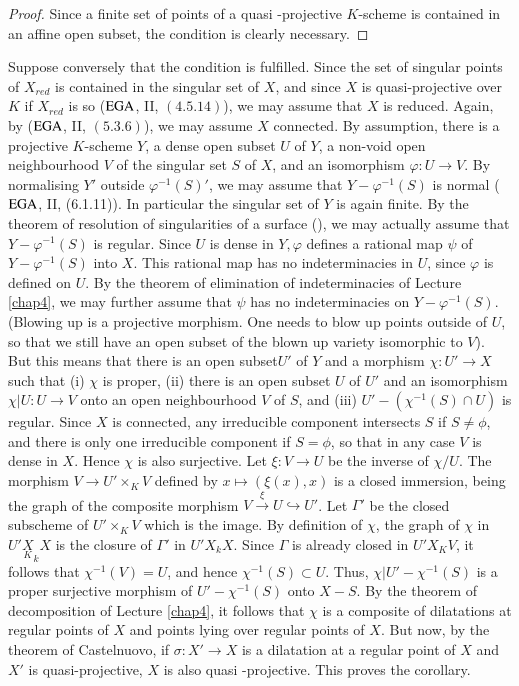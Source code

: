\begin{proof}
  Since a finite set of points of a quasi -projective $K$-scheme is
  contained in an affine open  subset, the condition is clearly
  necessary.  
\end{proof}
 
 Suppose conversely that the condition is fulfilled. Since the set of
 singular points of $X_{red}$ is contained  in the singular set of
 $X$, and since $X$ is quasi-projective over $K$ if $X_{red}$ is so
 ($\operatorname{EGA}$, II, $(4.5.14)$), we may assume that $X$ is reduced. Again, by
 ($\operatorname{EGA}$, II, $(5.3.6)$), we may assume $X$ connected. By assumption,
 there is a projective  $K$-scheme $Y$, a dense open subset $U$ of $Y$,
 a non-void open neighbourhood $V$ of the singular set $S$ of $X$, and
 an isomorphism $\varphi :U \rightarrow V$. By normalising $Y'$
 outside $\varphi^{-1}(S)'$, we may assume that $Y- \varphi^{-1}(S)$
 is normal ($\operatorname{EGA}$, II, (6.1.11)). In particular the singular set of
 $Y$ is again finite. By the theorem of resolution of singularities
 of a surface (\cite{key1}), we may actually
 assume that $Y-\varphi^{-1}(S)$ is regular. Since $U$ is dense in $Y,
 \varphi$ defines a rational map $\psi$ of $Y- \varphi^{-1}(S)$ into
 $X$. This rational map has no indeterminacies in $U$, since $\varphi$
 is defined on $U$. By the theorem of elimination of indeterminacies
 of Lecture \ref{chap4}, we may further assume that $\psi$ has no
 indeterminacies on $Y-\varphi^{-1}(S)$. (Blowing up is a projective
 morphism. One needs to blow up points outside of $U$, so that we
 still have an open subset of the blown up variety isomorphic to
 $V$). But this means that there is an open subset\pageoriginale $U'$
 of $Y$ and a 
 morphism $\chi :U' \rightarrow X$ such that (i) $\chi$ is proper,
 (ii) there is an open subset $U$ of $U'$ and an isomorphism $\chi
 |U:U \rightarrow V$ onto an open neighbourhood $V$ of $S$, and
 (iii) $U' - (\chi^{-1}(S) \cap U)$ is regular. Since $X$ is connected,
 any  irreducible component intersects $S$ if $S \neq \phi$, and there
 is only one irreducible component if $S =\phi$, so that in any case
 $V$ is dense in $X$. Hence $\chi$ is also surjective. Let $\xi : V
 \rightarrow U$ be the inverse of $\chi / U$. The  morphism $V \to U'
\times_K V$ defined by $x \mapsto (\xi (x), x)$ is a closed immersion,
 being the graph of the composite morphism $V \xrightarrow {\xi} U
 \hookrightarrow U'$. Let $\Gamma'$ be the closed subscheme of $U'
 \times_{K}V$ which is the image.  By definition of $\chi$, the graph of
 $\chi$ in $U' \underset{K}X_k X$ is the closure of $\Gamma'$ in $U' X_k
 X$. Since  $\Gamma$ is already closed in $U' X_K V$, it follows that
 $\chi^{-1}(V)=U$, and hence $\chi^{-1}(S) \subset U$. Thus, $\chi| U'
 -\chi^{-1}(S)$ is a proper surjective morphism of $U'- \chi^{-1}(S)$
 onto $X-S$. By the theorem of decomposition of Lecture \ref{chap4}, it
 follows that $\chi$ is a composite of dilatations at regular points
 of $X$ and points lying over regular points of $X$. But now, by the
 theorem of  Castelnuovo, if  $\sigma : X' \rightarrow X$ is a
 dilatation at a regular point of $X$ and $X'$ is quasi-projective,
 $X$ is also  quasi -projective. This proves the corollary. 
 
